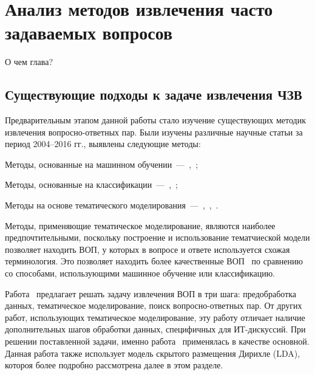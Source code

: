 \chapter{Анализ методов извлечения часто задаваемых вопросов}
\label{chap:overview}

О чем глава?

\section{Существующие подходы к задаче извлечения ЧЗВ}
\label{sec:researches}

Предварительным этапом данной работы стало изучение существующих методик извлечения вопросно-ответных пар. Были изучены различные научные статьи за период 2004--2016 гг., выявлены следующие методы:

\begin{itemize*}
\item Методы, основанные на машинном обучении~---~\cite{ML1},~\cite{ML2};
\item Методы, основанные на классификации~---~\cite{classif1},~\cite{engine};
\item Методы на основе тематического моделирования~---~\cite{LDA1},~\cite{LDA2},~\cite{original}.
\end{itemize*}

Методы, применяющие тематическое моделирование, являются наиболее предпочтительными, поскольку построение и использование тематчиеской модели позволяет находить ВОП, у которых в вопросе и ответе используется схожая терминология. Это позволяет находить более качественные ВОП~\cite{LDA2} по сравнению со способами, использующими машинное обучение или классификацию.

Работа~\cite{original} предлагает решать задачу извлечения ВОП в три шага: предобработка данных, тематическое моделирование, поиск вопросно-ответных пар. От других работ, использующих тематическое моделирование, эту работу отличает наличие дополнительных шагов обработки данных, специфичных для ИТ-дискуссий. При решении поставленной задачи, именно работа~\cite{original} применялась в качестве основной. Данная работа также использует модель скрытого размещения Дирихле (LDA), котороя более подробно рассмотрена далее в этом разделе.

